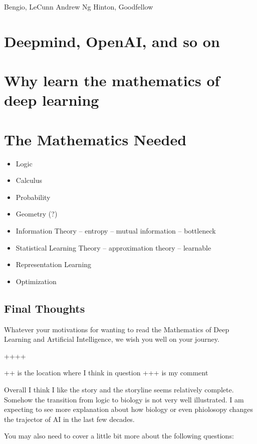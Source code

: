 \documentclass[]{book}
\providecommand{\tightlist}{%
  \setlength{\itemsep}{0pt}\setlength{\parskip}{0pt}}
\theoremstyle{definition}
\theoremstyle{definition}
\theoremstyle{definition}
\theoremstyle{remark}
\begin{document}
Bengio, LeCunn Andrew Ng Hinton, Goodfellow

\section{Deepmind, OpenAI, and so on}\label{deepmind-openai-and-so-on}

\section{Why learn the mathematics of deep
learning}\label{why-learn-the-mathematics-of-deep-learning}

\section{The Mathematics Needed}\label{the-mathematics-needed}

\begin{itemize}
\tightlist
\item
  Logic
\item
  Calculus
\item
  Probability
\item
  Geometry (?)
\item
  Information Theory -- entropy -- mutual information -- bottleneck
\item
  Statistical Learning Theory -- approximation theory -- learnable
\item
  Representation Learning
\item
  Optimization
\end{itemize}

\subsection{Final Thoughts}\label{final-thoughts}

Whatever your motivations for wanting to read the Mathematics of Deep
Learning and Artificial Intelligence, we wish you well on your journey.

++++

++ is the location where I think in question +++ is my comment

Overall I think I like the story and the storyline seems relatively
complete. Somehow the transition from logic to biology is not very well
illustrated. I am expecting to see more explanation about how biology or
even phiolosopy changes the trajector of AI in the last few decades.

You may also need to cover a little bit more about the following
questions:
\end{document}
